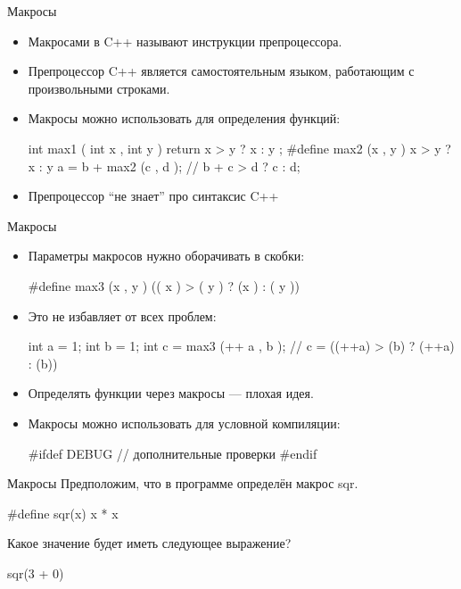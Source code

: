 \documentclass[
    9pt,
    hyperref={pdfencoding=unicode}
    ]{beamer}
\begin{document}
\begin{frame}[fragile]{Макросы}
    \begin{itemize}
        \item Макросами в C++ называют инструкции препроцессора.
        \item Препроцессор C++ является самостоятельным языком,
        работающим с произвольными строками.

        \item Макросы можно использовать для определения функций:
        \begin{cppcode}
            int max1 ( int x , int y ) {
                return x > y ? x : y ;
            }
            #define max2 (x , y ) x > y ? x : y
            a = b + max2 (c , d ); // b + c > d ? c : d;
        \end{cppcode}
        \item Препроцессор “не знает” про синтаксис C++
    \end{itemize}
\end{frame}

\begin{frame}[fragile]{Макросы}
    \begin{itemize}
        \item Параметры макросов нужно оборачивать в скобки:
        \begin{cppcode}
            #define max3 (x , y ) (( x ) > ( y ) ? (x ) : ( y ))
        \end{cppcode}
        \item Это не избавляет от всех проблем:
        \begin{cppcode}
            int a = 1;
            int b = 1;
            int c = max3 (++ a , b );
            // c = ((++a) > (b) ? (++a) : (b))
        \end{cppcode}
        \item Определять функции через макросы — плохая идея.
        \item Макросы можно использовать для условной компиляции:
        \begin{cppcode}
            #ifdef DEBUG
            // дополнительные проверки
            #endif

        \end{cppcode}
    \end{itemize}
\end{frame}

\begin{frame}[fragile]{Макросы}
    Предположим, что в программе определён макрос sqr.
    \begin{cppcode}
        #define sqr(x) x * x
    \end{cppcode}
    
    Какое значение будет иметь следующее выражение?
    \begin{cppcode}
        sqr(3 + 0)
    \end{cppcode}
\end{frame}
\end{document}
